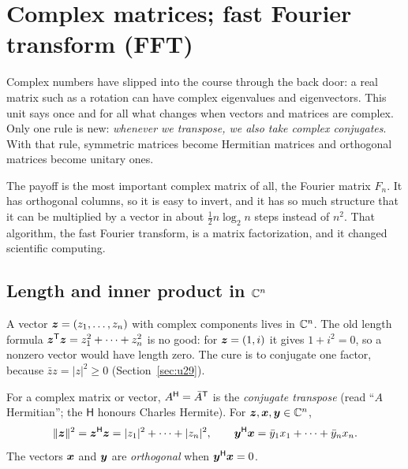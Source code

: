 \providecommand{\Hm}{^{\mathsf{H}}}%
\section{Complex matrices; fast Fourier transform (FFT)}\label{sec:u30}

Complex numbers have slipped into the course through the back door: a real matrix such as a
rotation can have complex eigenvalues and eigenvectors. This unit says once and for all what
changes when vectors and matrices are complex. Only one rule is new: \emph{whenever we
transpose, we also take complex conjugates}. With that rule, symmetric matrices become
Hermitian matrices and orthogonal matrices become unitary ones.

The payoff is the most important complex matrix of all, the Fourier matrix $F_n$. It has
orthogonal columns, so it is easy to invert, and it has so much structure that it can be
multiplied by a vector in about $\tfrac12 n\log_2 n$ steps instead of $n^2$. That algorithm, the
fast Fourier transform, is a matrix factorization, and it changed scientific computing.

\subsection{Length and inner product in \texorpdfstring{$\mathbb{C}^n$}{C\^{}n}}

A vector $\boldsymbol{z}=(z_1,\dots,z_n)$ with complex components lives in $\mathbb{C}^n$. The old length formula
$\boldsymbol{z}^{\mathsf{T}}\boldsymbol{z}=z_1^2+\cdots+z_n^2$ is no good: for $\boldsymbol{z}=(1,i)$ it gives $1+i^2=0$, so a nonzero vector
would have length zero. The cure is to conjugate one factor, because $\bar z z=|z|^2\ge0$
(Section~\ref{sec:u29}).

\begin{definition}\label{def:u30-hermitian-transpose}
For a complex matrix or vector, $A\Hm=\bar A\T$ is the \emph{conjugate transpose} (read
``$A$ Hermitian''; the $\mathsf{H}$ honours Charles Hermite). For $\boldsymbol{z},\boldsymbol{x},\boldsymbol{y}\in\mathbb{C}^n$,
\[
  \|\vb{z}\|^2=\vb{z}\Hm\vb{z}=|z_1|^2+\cdots+|z_n|^2,
  \qquad
  \vb{y}\Hm\vb{x}=\bar y_1x_1+\cdots+\bar y_nx_n .
\]
The vectors $\boldsymbol{x}$ and $\boldsymbol{y}$ are \emph{orthogonal} when $\vb{y}\Hm\vb{x}=0$.
\end{definition}

